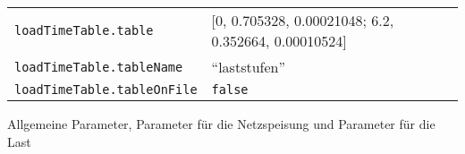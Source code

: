 \begin{longtable}[]{@{}ll@{}}
\begin{minipage}[t]{0.37\columnwidth}
\texttt{loadTimeTable.table}\strut
\end{minipage} & \begin{minipage}[t]{0.58\columnwidth}\raggedright
{[}0, 0.705328, 0.00021048; 6.2, 0.352664, 0.00010524{]}\strut
\end{minipage}\tabularnewline
\begin{minipage}[t]{0.37\columnwidth}\raggedright
\texttt{loadTimeTable.tableName}\strut
\end{minipage} & \begin{minipage}[t]{0.58\columnwidth}\raggedright
``laststufen''\strut
\end{minipage}\tabularnewline
\begin{minipage}[t]{0.37\columnwidth}\raggedright
\texttt{loadTimeTable.tableOnFile}\strut
\end{minipage} & \begin{minipage}[t]{0.58\columnwidth}\raggedright
\texttt{false}\strut
\end{minipage}\tabularnewline
\bottomrule
\end{longtable}

Allgemeine Parameter, Parameter für die Netzspeisung und Parameter für
die Last
